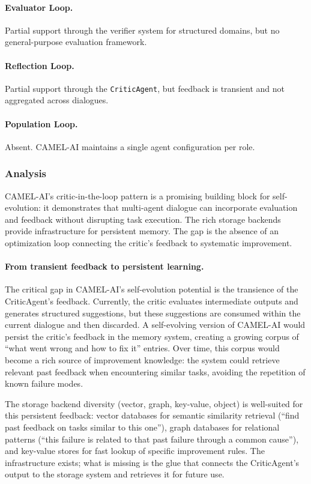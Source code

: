 \paragraph{Evaluator Loop.}
Partial support through the verifier system for structured domains, but no general-purpose evaluation framework.

\paragraph{Reflection Loop.}
Partial support through the \texttt{CriticAgent}, but feedback is transient and not aggregated across dialogues.

\paragraph{Population Loop.}
Absent. CAMEL-AI maintains a single agent configuration per role.

\subsubsection{Analysis}

CAMEL-AI's critic-in-the-loop pattern is a promising building block for self-evolution: it demonstrates that multi-agent dialogue can incorporate evaluation and feedback without disrupting task execution. The rich storage backends provide infrastructure for persistent memory. The gap is the absence of an optimization loop connecting the critic's feedback to systematic improvement.

\paragraph{From transient feedback to persistent learning.}
The critical gap in CAMEL-AI's self-evolution potential is the transience of the CriticAgent's feedback. Currently, the critic evaluates intermediate outputs and generates structured suggestions, but these suggestions are consumed within the current dialogue and then discarded. A self-evolving version of CAMEL-AI would persist the critic's feedback in the memory system, creating a growing corpus of ``what went wrong and how to fix it'' entries. Over time, this corpus would become a rich source of improvement knowledge: the system could retrieve relevant past feedback when encountering similar tasks, avoiding the repetition of known failure modes.

The storage backend diversity (vector, graph, key-value, object) is well-suited for this persistent feedback: vector databases for semantic similarity retrieval (``find past feedback on tasks similar to this one''), graph databases for relational patterns (``this failure is related to that past failure through a common cause''), and key-value stores for fast lookup of specific improvement rules. The infrastructure exists; what is missing is the glue that connects the CriticAgent's output to the storage system and retrieves it for future use.

